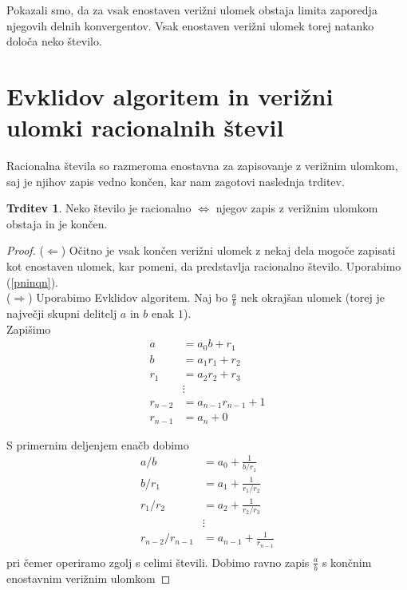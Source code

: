 \documentclass[a4paper,12pt]{article}
\theoremstyle{definition}
\theoremstyle{proposition}
\newtheorem{trd}{Trditev}[section]
\theoremstyle{theorem}
\theoremstyle{lemma}
\begin{document}
Pokazali smo, da za vsak enostaven verižni ulomek obstaja limita zaporedja njegovih delnih konvergentov. Vsak enostaven verižni ulomek torej natanko določa neko število.

\section{Evklidov algoritem in verižni ulomki racionalnih števil} \label{racionalna}

Racionalna števila so razmeroma enostavna za zapisovanje z verižnim ulomkom, saj je njihov zapis vedno končen, kar nam zagotovi naslednja trditev.

\begin{trd}
\label{lastnosracionalnega}
Neko število je racionalno $\Leftrightarrow$ njegov zapis z verižnim ulomkom obstaja in je končen.
\end{trd}

\begin{proof}
($\Leftarrow$) Očitno je vsak končen verižni ulomek z nekaj dela mogoče zapisati kot enostaven ulomek, kar pomeni, da predstavlja racionalno število. Uporabimo (\ref{pninqn}).\\
($\Rightarrow$) Uporabimo Evklidov algoritem. Naj bo $\frac{a}{b}$ nek okrajšan ulomek (torej je največji skupni delitelj $a$ in $b$ enak $1$).\\
Zapišimo
\begin{align*}
a &= a_0 b + r_1 \\
b &= a_1 r_1 + r_2 \\
r_1 &= a_2 r_2 + r_3 \\
&\vdots \\
r_{n-2} &= a_{n-1} r_{n-1} + 1 \\
r_{n-1} &= a_n + 0
\end{align*}

\vspace{5mm}

S primernim deljenjem enačb dobimo
\begin{align*}
a/b &= a_0 + \frac{1}{b/r_1} \\
b/r_1 &= a_1 + \frac{1}{r_1/r_2} \\
r_1/r_2 &= a_2 + \frac{1}{r_2/r_3} \\
&\vdots \\
r_{n-2}/r_{n-1} &= a_{n-1} + \frac{1}{r_{n-1}} \\
\end{align*}
pri čemer operiramo zgolj s celimi števili. Dobimo ravno zapis $\frac{a}{b}$ s končnim enostavnim verižnim ulomkom
\end{proof}
\end{document}
